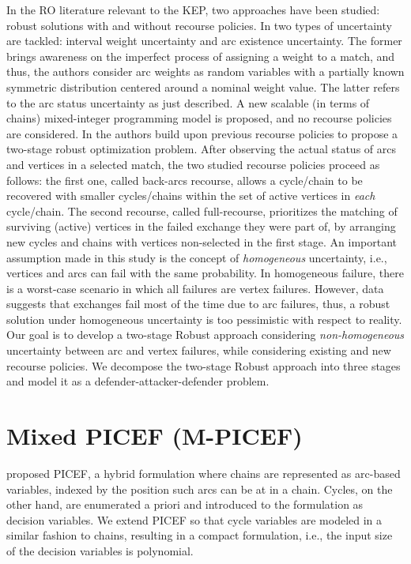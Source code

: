 \documentclass{article}
\begin{document}
	In the RO literature relevant to the KEP, two approaches have been studied: robust solutions with and without recourse policies. In \cite{Duncan2019} two types of uncertainty are tackled: interval weight uncertainty and arc existence uncertainty. The former brings awareness on the imperfect process of assigning a weight to a match, and thus, the authors consider arc weights as random variables with a partially known symmetric distribution centered around a nominal weight value. The latter refers to the arc status uncertainty as just described. A new scalable (in terms of chains) mixed-integer programming model is proposed, and no recourse policies are considered. In \citep{Carvalho2020} the authors build upon previous recourse policies to propose a two-stage robust optimization problem. After observing the actual status of arcs and vertices in a selected match, the two studied recourse policies proceed as follows: the first one, called back-arcs recourse, allows a cycle/chain to be recovered with smaller cycles/chains within the set of active vertices in \textit{each} cycle/chain. The second recourse, called full-recourse, prioritizes the matching of surviving (active) vertices in the failed exchange they were part of, by arranging new cycles and chains with vertices non-selected in the first stage. An important assumption made in this study is the concept of \textit{homogeneous} uncertainty, i.e., vertices and arcs can fail with the same probability. In homogeneous failure, there is a worst-case scenario in which all failures are vertex failures. However, data suggests that exchanges fail most of the time due to arc failures, thus, a robust solution under homogeneous uncertainty is too pessimistic with respect to reality. Our goal is to develop a two-stage Robust approach considering \textit{non-homogeneous} uncertainty between arc and vertex failures, while considering existing and new recourse policies. We decompose the two-stage Robust approach into three stages and model it as a defender-attacker-defender problem.
	
	\section{Mixed PICEF (M-PICEF)}
	
	\cite{Dickerson2016} proposed PICEF, a hybrid formulation where chains are represented as arc-based variables, indexed by the position such arcs can be at in a chain. Cycles, on the other hand, are enumerated a priori and introduced to the formulation as decision variables. We extend PICEF so that cycle variables are modeled in a similar fashion to chains, resulting in a compact formulation, i.e., the input size of the decision variables is polynomial.
	
\end{document}
